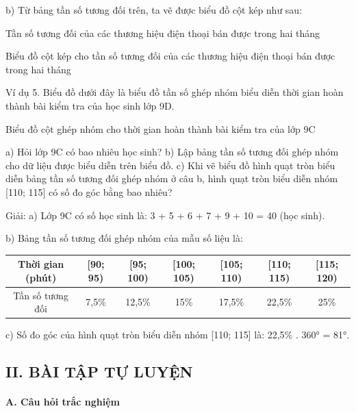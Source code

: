 \documentclass[%
    fontsize=12pt,%
    chapterprefix=false,%
    open=right,%
    twoside=false,%
    numbers=noenddot,%
    headings=optiontohead,%
    final,%
    DIV=15,%
    parskip=half %
]{scrbook}
\begin{document}

b) Từ bảng tần số tương đối trên, ta vẽ được biểu đồ cột kép như sau:

Tần số tương đối của các thương hiệu điện thoại bán được trong hai tháng

Biểu đồ cột kép cho tần số tương đối của các thương hiệu điện thoại bán được trong hai tháng

Ví dụ 5. Biểu đồ dưới đây là biểu đồ tần số ghép nhóm biểu diễn thời gian hoàn thành bài kiểm tra của học sinh lớp 9D.

Biểu đồ cột ghép nhóm cho thời gian hoàn thành bài kiểm tra của lớp 9C

a) Hỏi lớp 9C có bao nhiêu học sinh? b) Lập bảng tần số tương đối ghép nhóm cho dữ liệu được biểu diễn trên biểu đồ. c) Khi vẽ biểu đồ hình quạt tròn biểu diễn bảng tần số tương đối ghép nhóm ở câu b, hình quạt tròn biểu diễn nhóm [110; 115] có số đo góc bằng bao nhiêu?

Giải: a) Lớp 9C có số học sinh là: 3 + 5 + 6 + 7 + 9 + 10 = 40 (học sinh).


b) Bảng tần số tương đối ghép nhóm của mẫu số liệu là:

\begin{tabular}{|c|c|c|c|c|c|c|} \hline Thời gian (phút) & [90; 95) & [95; 100) & [100; 105) & [105; 110) & [110; 115) & [115; 120) \\ \hline Tần số tương đối & 7,5\% & 12,5\% & 15\% & 17,5\% & 22,5\% & 25\% \\ \hline \end{tabular}

c) Số đo góc của hình quạt tròn biểu diễn nhóm [110; 115] là: 22,5\% . 360° = 81°.
\subsection{II. BÀI TẬP TỰ LUYỆN}
\paragraph{A. Câu hỏi trắc nghiệm}
\end{document}
